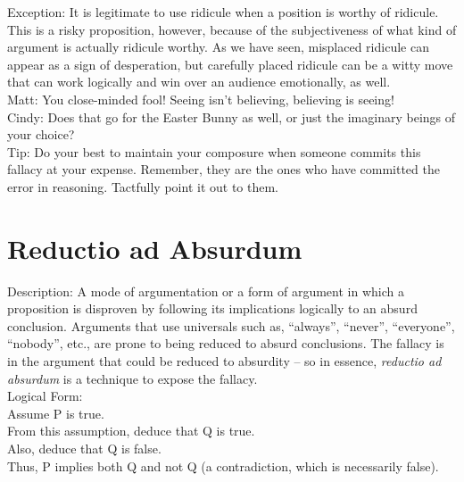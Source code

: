 \documentclass[a4paper,12pt,single,pdftex]{scrbook}
\begin{document}
{      
        Exception: It is legitimate to use ridicule when a position is worthy of ridicule.  This is a risky proposition, however, because of the subjectiveness of what kind of argument is actually ridicule worthy.  As we have seen, misplaced ridicule can appear as a sign of desperation, but carefully placed ridicule can be a witty move that can work logically and win over an audience emotionally, as well.
      \\

      
        Matt: You close-minded fool!  Seeing isn’t believing, believing is seeing!
      \\

      
        Cindy: Does that go for the Easter Bunny as well, or just the imaginary beings of your choice?
      \\

      
        Tip: Do your best to maintain your composure when someone commits this fallacy at your expense.  Remember, they are the ones who have committed the error in reasoning.  Tactfully point it out to them.
      \\

    
    \chapter{
      Reductio ad Absurdum
    }
  
    
      
        Description: A mode of argumentation or a form of argument in which a proposition is disproven by following its implications logically to an absurd conclusion.  Arguments that use universals such as, “always”, “never”, “everyone”, “nobody”, etc., are prone to being reduced to absurd conclusions.  The fallacy is in the argument that could be reduced to absurdity -- so in essence, {\it reductio ad absurdum} is a technique to expose the fallacy.
      \\

      
        Logical Form:
      \\

      
        Assume P is true.
      \\

      
        From this assumption, deduce that Q is true.
      \\

      
        Also, deduce that Q is false.
      \\

      
        Thus, P implies both Q and not Q (a contradiction, which is necessarily false).
      \\

}
\end{document}
